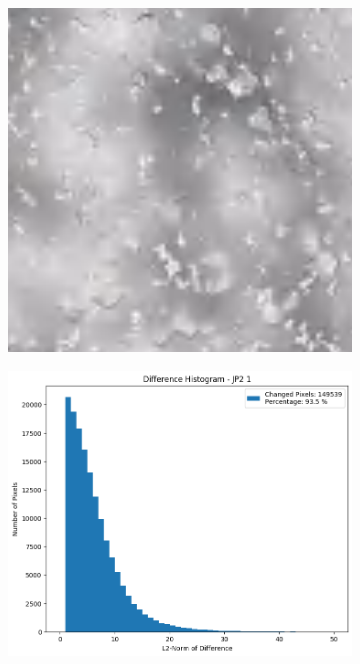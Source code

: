 \begin{figure}[htb]
    \centering
    \begin{subfigure}[b]{0.48\textwidth}
        \centering
        \includegraphics[width=\textwidth]{doc/thesis/0_figures/compare_quality/set1/jp2_1_center.png}
        \caption{}
        \label{fig:img_quality_comp_jp2_1_center_orig}
    \end{subfigure}
    \begin{subfigure}[b]{0.48\textwidth}
        \centering
        \includegraphics[width=\textwidth]{doc/thesis/0_figures/compare_quality/set1/jp2_1_center_diff_histogram.png}

\end{subfigure}
\end{figure}
